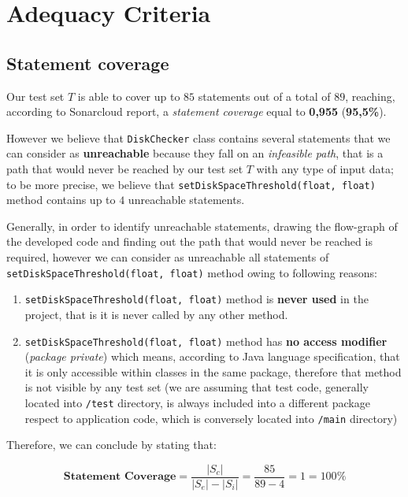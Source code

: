 \documentclass[conference]{IEEEtran}
\newcommand{\abs}[1]{\left|#1\right|}
\begin{document}
\section{Adequacy Criteria}

\subsection{Statement coverage}

Our test set $T$ is able to cover up to $85$ statements out of a total of $89$, reaching, according to Sonarcloud report, a \textit{statement coverage} equal to \textbf{0,955} (\textbf{95,5\%}).

However we believe that \texttt{DiskChecker} class contains several statements that we can consider as \textbf{unreachable} because they fall on an \textit{infeasible path}, that is a path that would never be reached by our test set $T$ with any type of input data; to be more precise, we believe that  \texttt{setDiskSpaceThreshold(float, float)} method contains up to $4$ unreachable statements. 

Generally, in order to identify unreachable statements, drawing the flow-graph of the developed code and finding out the path that would never be reached is required, however we can consider as unreachable all statements of \texttt{setDiskSpaceThreshold(float, float)} method owing to following reasons:

\begin{enumerate}
\item \texttt{setDiskSpaceThreshold(float, float)} method is \textbf{never used} in the project, that is it is never called by any other method.
\item \texttt{setDiskSpaceThreshold(float, float)} method has \textbf{no access modifier} (\textit{package private}) which means, according to Java language specification, that it is only accessible within classes in the same package, therefore that method is not visible by any test set (we are assuming that test code, generally located into \texttt{/test} directory, is always included into a different package respect to application code, which is conversely located into \texttt{/main} directory)
\end{enumerate}

Therefore, we can conclude by stating that:

\begin{equation} 
\textbf{Statement Coverage} = \dfrac{\abs{S_c}}{\abs{S_e} - \abs{S_i}} = \dfrac{85}{89-4} = 1 = 100\%
\end{equation}
\end{document}

